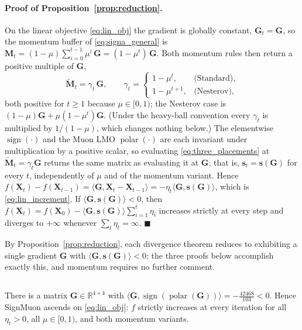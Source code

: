 \paragraph{Proof of Proposition~\ref{prop:reduction}.} On the linear objective \eqref{eq:lin_obj} the gradient is globally constant, $\mathbf{G}_t=\mathbf{G}$, so the momentum buffer of \eqref{eq:signa_general} is $\mathbf{M}_t=(1-\mu)\sum_{i=0}^{t-1}\mu^i\,\mathbf{G}=(1-\mu^t)\,\mathbf{G}$. Both momentum rules then return a positive multiple of $\mathbf{G}$,
\begin{equation}
\tilde{\mathbf{M}}_t=\gamma_t\,\mathbf{G},\qquad
\gamma_t=
\begin{cases}
1-\mu^{t}, & \text{(Standard)},\\[2pt]
1-\mu^{t+1}, & \text{(Nesterov)},
\end{cases}
\end{equation}
both positive for $t\ge1$ because $\mu\in[0,1)$; the Nesterov case is $(1-\mu)\mathbf{G}+\mu(1-\mu^{t})\mathbf{G}$. (Under the heavy-ball convention every $\gamma_t$ is multiplied by $1/(1-\mu)$, which changes nothing below.) The elementwise $\operatorname{sign}(\cdot)$ and the Muon LMO $\operatorname{polar}(\cdot)$ are each invariant under multiplication by a positive scalar, so evaluating \eqref{eq:three_placements} at $\tilde{\mathbf{M}}_t=\gamma_t\mathbf{G}$ returns the same matrix as evaluating it at $\mathbf{G}$; that is, $\mathbf{s}_t=\mathbf{s}(\mathbf{G})$ for every $t$, independently of $\mu$ and of the momentum variant. Hence $f(\mathbf{X}_{t})-f(\mathbf{X}_{t-1})=\langle\mathbf{G},\mathbf{X}_{t}-\mathbf{X}_{t-1}\rangle=-\eta_t\langle\mathbf{G},\mathbf{s}(\mathbf{G})\rangle$, which is \eqref{eq:lin_increment}. If $\langle\mathbf{G},\mathbf{s}(\mathbf{G})\rangle<0$, then $f(\mathbf{X}_t)=f(\mathbf{X}_0)-\langle\mathbf{G},\mathbf{s}(\mathbf{G})\rangle\sum_{i=1}^{t}\eta_i$ increases strictly at every step and diverges to $+\infty$ whenever $\sum_t\eta_t=\infty$. $\blacksquare$

By Proposition~\ref{prop:reduction}, each divergence theorem reduces to exhibiting a single gradient $\mathbf{G}$ with $\langle\mathbf{G},\mathbf{s}(\mathbf{G})\rangle<0$; the three proofs below accomplish exactly this, and momentum requires no further comment.

\subsection{}\label{app:proof_th1}
\setcounter{theorem}{0}
\begin{theorem}\label{th:1}
There is a matrix $\mathbf{G}\in\mathbb{R}^{4\times4}$ with $\bigl\langle \mathbf{G},\operatorname{sign}(\operatorname{polar}(\mathbf{G}))\bigr\rangle=-\tfrac{42468}{103}<0$. Hence SignMuon ascends on \eqref{eq:lin_obj}: $f$ strictly increases at every iteration for all $\eta_t>0$, all $\mu\in[0,1)$, and both momentum variants.
\end{theorem}

